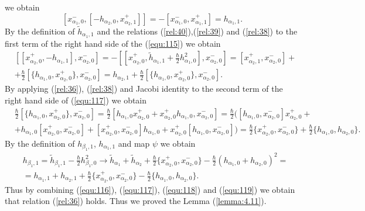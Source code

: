 \documentclass[english]{elsarticle}
\numberwithin{equation}{section}
\begin{document}
we obtain
\begin{equation}
\label{equ:116}
[x_{\alpha_{1},0}^{-},[-h_{\alpha_{2},0},x_{\alpha_{2},1}^{+}]] = -[x_{\alpha_{1},0}^{-},x_{\alpha_{1},1}^{+}] = h_{\alpha_{1},1}.
\end{equation}
By the definition of $\tilde{h}_{\alpha_{1},1}$ and the relations (\ref{rel:40}),(\ref{rel:39}) and (\ref{rel:38}) to the first term of the right hand side of the (\ref{equ:115})  we obtain
\begin{equation}
\label{equ:117}
\begin{split}
&[[x_{\alpha_{2},0}^{+},-h_{\alpha_{1},1}],x_{\alpha_{2},0}^{-}] = -[[x_{\alpha_{2},0}^{+},\tilde{h}_{\alpha_{1},1}+\frac{\hbar}{2}h_{\alpha_{1},0}^{2}],x_{\alpha_{2},0}^{-}] = [x_{\alpha_{2},1}^{+},x_{\alpha_{2},0}^{-}] + \\
&+\frac{\hbar}{2}[\{h_{\alpha_{1},0},x_{\alpha_{2},0}^{+}\},x_{\alpha_{2},0}^{-}]=h_{\alpha_{2},1} + \frac{\hbar}{2}[\{h_{\alpha_{1},0},x_{\alpha_{2},0}^{+}\},x_{\alpha_{2},0}^{-}].
\end{split}
\end{equation}
By applying (\ref{rel:36}), (\ref{rel:38}) and Jacobi identity to the second term of the right hand side of (\ref{equ:117})
we obtain
\begin{equation}
\label{equ:118}
\begin{split}
&\frac{\hbar}{2}[\{h_{\alpha_{1},0},x_{\alpha_{2},0}^{+}\},x_{\alpha_{2},0}^{-}]=\frac{\hbar}{2}[h_{\alpha_{1},0}x_{\alpha_{2},0}^{+}+x_{\alpha_{2},0}^{+}h_{\alpha_{1},0},x_{\alpha_{2},0}^{-}]=\frac{\hbar}{2}([h_{\alpha_{1},0},x_{\alpha_{2},0}^{-}]x_{\alpha_{2},0}^{+}
+\\
&+h_{\alpha_{1},0}[x_{\alpha_{2},0}^{+},x_{\alpha_{2},0}^{-}]
+[x_{\alpha_{2},0}^{+},x_{\alpha_{2},0}^{-}]h_{\alpha_{1},0}+x_{\alpha_{2},0}^{+}[h_{\alpha_{1},0},x_{\alpha_{2},0}^{-}])= \frac{\hbar}{2}\{x_{\alpha_{2},0}^{+},x_{\alpha_{2},0}^{-}\}+\frac{\hbar}{2}\{h_{\alpha_{1},0},h_{\alpha_{2},0}\}.
\end{split}
\end{equation}
By the definition of $h_{\beta_{1},1}$, $h_{\alpha_{1},1}$ and map $\psi$ we obtain
\begin{equation}
\label{equ:119}
\begin{split}
&h_{\beta_{1},1}=\tilde{h}_{\beta_{1},1}-\frac{\hbar}{2}h_{\beta_{1},0}^{2}\rightarrow \tilde{h}_{\alpha_1}+\tilde{h}_{\alpha_2}+\frac{\hbar}{2}\{x_{\alpha_{2},0}^{+},x_{\alpha_{2},0}^{-}\} - \frac{\hbar}{2}(h_{\alpha_{1},0}+h_{\alpha_{2},0})^{2}=\\
&=h_{\alpha_{1},1}+h_{\alpha_{2},1}+ \frac{\hbar}{2}\{x_{\alpha_{2},0}^{+},x_{\alpha_{2},0}^{-}\} - \frac{\hbar}{2}\{h_{\alpha_{1},0},h_{\alpha_{2},0}\}.
\end{split}
\end{equation}
Thus by combining (\ref{equ:116}), (\ref{equ:117}), (\ref{equ:118}) and (\ref{equ:119}) we obtain that relation (\ref{rel:36}) holds. Thus we proved the Lemma (\ref{lemma:4.11}).
\end{document}
